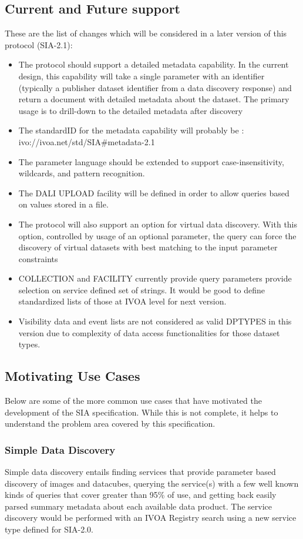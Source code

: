 \documentclass[11pt,a4paper]{ivoa}
\begin{document}
\subsection{Current and Future support}
 These are the list of changes which  will be considered in a later version of this protocol  (SIA-2.1):
\begin{itemize}
    \item The protocol should support  a detailed {metadata} capability. In the current design, this   capability will take a single parameter with an identifier (typically a publisher dataset identifier from a data discovery response) and return a document with detailed metadata about the dataset. The primary usage is to drill-down to the detailed  metadata after discovery
    \item The standardID for the {metadata} capability will  probably be : ivo://ivoa.net/std/SIA\#metadata-2.1  
    \item  The parameter language should be extended to support case-insensitivity, wildcards, and pattern recognition.
    \item The DALI UPLOAD facility will be defined in order to allow queries based on values stored in a file.
    \item The protocol will also support an option for virtual data discovery. With this option, controlled by usage of an optional parameter, the  query can force the discovery of virtual datasets with best  matching to the input parameter constraints
    \item COLLECTION and FACILITY currently provide query parameters provide selection on service defined set of strings. It would be good to define standardized lists of those at IVOA level for next version.
    \item Visibility data and event lists are not considered as valid DPTYPES in this version due to complexity of data access functionalities for those dataset types.  
\end{itemize}

\subsection{Motivating Use Cases}
Below are some of the more common use cases that have motivated the development of the SIA specification. While this is not complete, it helps to understand the problem area covered by this specification.
\subsubsection{Simple Data Discovery}
Simple data discovery entails finding services that provide parameter based discovery of images and datacubes, querying the service(s) with a few well known kinds of queries that cover greater than 95\% of use, and getting back easily parsed summary metadata about each available data product. The service discovery would be performed with an IVOA Registry search using a new service type defined for SIA-2.0. 
\end{document}

